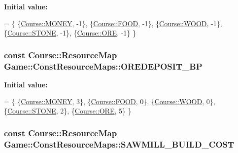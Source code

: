 {\bfseries Initial value\-:}
\begin{DoxyCode}
= \{
    \{\hyperlink{namespaceCourse_a02d49c04029594d4adba79b84bb85f65aff016add6bbbdbb44abf1d2d7f215ec0}{Course::MONEY}, -1\},
    \{\hyperlink{namespaceCourse_a02d49c04029594d4adba79b84bb85f65a7018c47af38bfc1390a89e70b4cf4760}{Course::FOOD}, -1\},
    \{\hyperlink{namespaceCourse_a02d49c04029594d4adba79b84bb85f65a87287be3009253b983ffb2e9f91eef22}{Course::WOOD}, -1\},
    \{\hyperlink{namespaceCourse_a02d49c04029594d4adba79b84bb85f65a8598c3079c2be7785410e724cc190229}{Course::STONE}, -1\},
    \{\hyperlink{namespaceCourse_a02d49c04029594d4adba79b84bb85f65af416a215c7dad21349df38d35be0a1e1}{Course::ORE}, -1\}
\}
\end{DoxyCode}
\hypertarget{namespaceGame_1_1ConstResourceMaps_a7b803a949c1a3e044a6a6f985928a0cc}{
\subsubsection[{O\-R\-E\-D\-E\-P\-O\-S\-I\-T\-\_\-\-B\-P}]{\setlength{\rightskip}{0pt plus 5cm}const {\bf Course\-::\-Resource\-Map} Game\-::\-Const\-Resource\-Maps\-::\-O\-R\-E\-D\-E\-P\-O\-S\-I\-T\-\_\-\-B\-P}}\label{namespaceGame_1_1ConstResourceMaps_a7b803a949c1a3e044a6a6f985928a0cc}
{\bfseries Initial value\-:}
\begin{DoxyCode}
= \{
    \{\hyperlink{namespaceCourse_a02d49c04029594d4adba79b84bb85f65aff016add6bbbdbb44abf1d2d7f215ec0}{Course::MONEY}, 3\},
    \{\hyperlink{namespaceCourse_a02d49c04029594d4adba79b84bb85f65a7018c47af38bfc1390a89e70b4cf4760}{Course::FOOD}, 0\},
    \{\hyperlink{namespaceCourse_a02d49c04029594d4adba79b84bb85f65a87287be3009253b983ffb2e9f91eef22}{Course::WOOD}, 0\},
    \{\hyperlink{namespaceCourse_a02d49c04029594d4adba79b84bb85f65a8598c3079c2be7785410e724cc190229}{Course::STONE}, 2\},
    \{\hyperlink{namespaceCourse_a02d49c04029594d4adba79b84bb85f65af416a215c7dad21349df38d35be0a1e1}{Course::ORE}, 5\}
\}
\end{DoxyCode}
\hypertarget{namespaceGame_1_1ConstResourceMaps_a8101879b3f9a231535e629475969da07}{
\subsubsection[{S\-A\-W\-M\-I\-L\-L\-\_\-\-B\-U\-I\-L\-D\-\_\-\-C\-O\-S\-T}]{\setlength{\rightskip}{0pt plus 5cm}const {\bf Course\-::\-Resource\-Map} Game\-::\-Const\-Resource\-Maps\-::\-S\-A\-W\-M\-I\-L\-L\-\_\-\-B\-U\-I\-L\-D\-\_\-\-C\-O\-S\-T}}\label{namespaceGame_1_1ConstResourceMaps_a8101879b3f9a231535e629475969da07}

